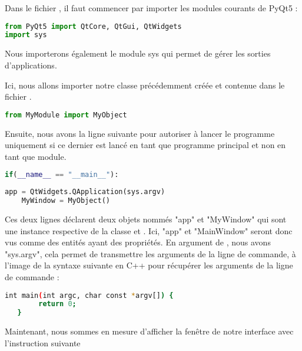
Dans le fichier , il faut commencer par importer les modules courants de PyQt5 : 
\begin{lstlisting}[language=Python]
from PyQt5 import QtCore, QtGui, QtWidgets
import sys
\end{lstlisting}
Nous importerons également le module sys qui permet de gérer les sorties d'applications. \newline

Ici, nous allons importer notre classe  précédemment créée et contenue dans le fichier .
\begin{lstlisting}[language=Python]
from MyModule import MyObject
\end{lstlisting}


Ensuite, nous avons la ligne suivante pour autoriser à lancer le programme uniquement si ce dernier est lancé en tant que programme principal et non en tant que module.

\begin{lstlisting}[language=Python]
if(__name__ == "__main__"):
\end{lstlisting}


\begin{lstlisting}[language=Python]
    app = QtWidgets.QApplication(sys.argv)
    MyWindow = MyObject()
\end{lstlisting}

Ces deux lignes déclarent deux objets nommés "app" et "MyWindow" qui sont une instance respective de la classe  et . \newline
Ici, "app" et "MainWindow" seront donc vus comme des entités ayant des propriétés.\newline
En argument de , nous avons "sys.argv", cela permet de transmettre les arguments de la ligne de commande, à l'image de la syntaxe suivante en C++ pour récupérer les arguments de la ligne de commande : \newline\newline
\begin{lstlisting}[language=bash]
   int main(int argc, char const *argv[]) {
        return 0;
   }
\end{lstlisting}


Maintenant, nous sommes en mesure  d'afficher la fenêtre de notre interface avec l'instruction suivante

